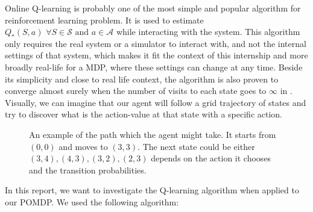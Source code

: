 \documentclass[
  a4paper, xcolor = usenames,dvipsnames]{article}
\theoremstyle{definition}
\theoremstyle{definition}
\theoremstyle{definition}
\theoremstyle{definition}
\theoremstyle{remark}
\begin{document}
Online Q-learning is probably one of the most simple and popular algorithm for reinforcement learning problem. It is used to estimate \(Q_{*}(S, a) \,\, \forall S \in \mathcal{S} \text{ and } a \in \mathcal{A}\) while interacting with the system. This algorithm only requires the real system or a simulator to interact with, and not the internal settings of that system, which makes it fit the context of this internship and more broadly real-life for a MDP, where these settings can change at any time. Beside its simplicity and close to real life context, the algorithm is also proven to converge almost surely when the number of visits to each state goes to \(\infty\) in \autocite{q-learning-converge}. Visually, we can imagine that our agent will follow a grid trajectory of states and try to discover what is the action-value at that state with a specific action.

\begin{figure}
\centering
\def\mycolumns{5}
\def\myrows{5}
\caption[An example of the path which the agent might take]{An example of the path which the agent might take. It starts from $(0, 0)$ and moves to $(3, 3)$. The next state could be either $(3, 4), (4, 3), (3, 2), (2, 3)$ depends on the action it chooses and the transition probabilities.}
\end{figure}

In this report, we want to investigate the Q-learning algorithm when applied to our POMDP. We used the following algorithm:
\end{document}
